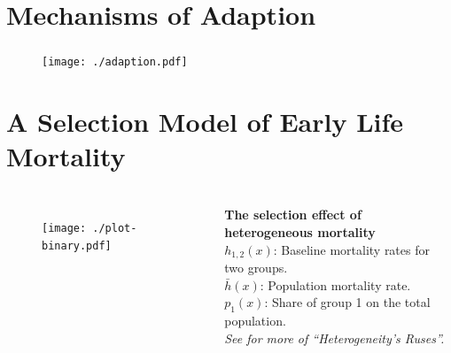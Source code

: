 \documentclass{beamer}
\begin{document}
\section{Mechanisms of Adaption} %

\begin{frame}
\frametitle{\insertsection}

\begin{figure}[htb!]
\texttt{[image: ./adaption.pdf]}\\
\end{figure}

\end{frame}

\section{A Selection Model of Early Life Mortality} %

\begin{frame}
\frametitle{\insertsection}

\begin{columns}[c]

\begin{figure}[htb!]
\texttt{[image: ./plot-binary.pdf]}\\
\end{figure}

\footnotesize\textbf{The selection effect of heterogeneous mortality}\\
$h_{1,2}(x)$: Baseline mortality rates for two groups.\\
$\bar{h}(x)$: Population mortality rate.\\
$p_1(x)$: Share of group 1 on the total population. \\ \scriptsize\emph{See \cite{Vaupel1985} for more of \enquote{Heterogeneity's Ruses}.}

\end{columns}

\end{frame}
\end{document}
